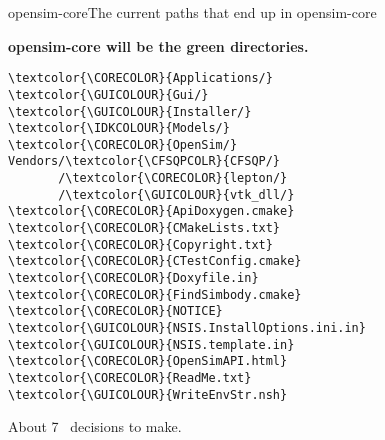 \documentclass[pdf, 8pt]{beamer}
\def\NUMDECISIONS{7}
\def\GUICOLOUR{black}
\def\CORECOLOR{green!60!black}
\def\IDKCOLOUR{orange}
\def\CFSQPCOLR{black}
\begin{document}
\begin{frame}[fragile]{opensim-core}{The current paths that end up in
    opensim-core}

    \textbf{opensim-core will be the green directories.}

\begin{Verbatim}
\textcolor{\CORECOLOR}{Applications/}
\textcolor{\GUICOLOUR}{Gui/}
\textcolor{\GUICOLOUR}{Installer/}
\textcolor{\IDKCOLOUR}{Models/}
\textcolor{\CORECOLOR}{OpenSim/}
Vendors/\textcolor{\CFSQPCOLR}{CFSQP/}
       /\textcolor{\CORECOLOR}{lepton/}
       /\textcolor{\GUICOLOUR}{vtk_dll/}
\textcolor{\CORECOLOR}{ApiDoxygen.cmake}
\textcolor{\CORECOLOR}{CMakeLists.txt}
\textcolor{\CORECOLOR}{Copyright.txt}
\textcolor{\CORECOLOR}{CTestConfig.cmake}
\textcolor{\CORECOLOR}{Doxyfile.in}
\textcolor{\CORECOLOR}{FindSimbody.cmake}
\textcolor{\CORECOLOR}{NOTICE}
\textcolor{\GUICOLOUR}{NSIS.InstallOptions.ini.in}
\textcolor{\GUICOLOUR}{NSIS.template.in}
\textcolor{\CORECOLOR}{OpenSimAPI.html}
\textcolor{\CORECOLOR}{ReadMe.txt}
\textcolor{\GUICOLOUR}{WriteEnvStr.nsh}
\end{Verbatim}
\end{frame}

\begin{frame}
    About \NUMDECISIONS~ decisions to make.
\end{frame}
\end{document}
